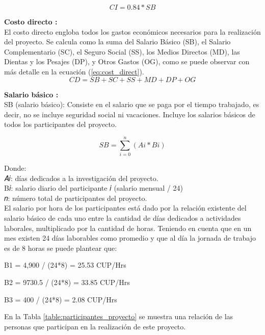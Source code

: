 \begin{equation}
    \label{eq:cost_indirect}
    CI = 0.84 * SB
\end{equation}

\textbf{Costo directo :}\\
El costo directo engloba todos los gastos económicos necesarios para la realización del proyecto. Se
calcula como la suma del Salario Básico (SB), el Salario Complementario (SC), el Seguro Social (SS), los
Medios Directos (MD), las Dientas y los Pesajes (DP), y Otros Gastos (OG), como se puede observar con más
detalle en la ecuación (\ref{eq:cost_direct}). \\

\begin{equation}
    \label{eq:cost_direct}
    CD = SB + SC + SS + MD + DP + OG
\end{equation}

\textbf{Salario básico :}\\
SB (salario básico): Consiste en el salario que se paga por el tiempo trabajado, es decir, no se incluye seguridad social ni vacaciones. Incluye los salarios básicos de todos los participantes del proyecto.


\begin{equation}
    \label{eq:sal_basico}
    SB = \sum_{i = 0}^{n} (Ai * Bi)
\end{equation}

Donde:\\
𝐴𝑖: días dedicados a la investigación del proyecto.\\
B𝑖: salario diario del participante 𝑖 (salario mensual / 24)\\
𝑛: número total de participantes del proyecto.\\

El salario por hora de los participantes está dado por la relación existente del salario
básico de cada uno entre la cantidad de días dedicados a actividades laborales,
multiplicado por la cantidad de horas. Teniendo en cuenta que en un mes existen 24
días laborables como promedio y que al día la jornada de trabajo es de 8 horas se
puede plantear que:

B1 = 4,900 / (24*8) = 25.53 CUP/Hrs

B2 = 9730.5 / (24*8) = 33.85 CUP/Hrs

B3 = 400 / (24*8) = 2.08 CUP/Hrs

En la Tabla \ref{table:participantes_proyecto} se muestra una relación de las personas que participan en la realización de este proyecto.

